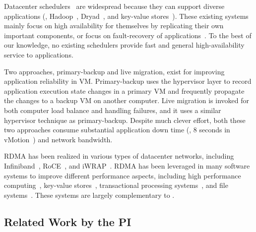  Datacenter
schedulers~\cite{borg:eurosys15,mesos:nsdi11,tupperware,yarn:socc13,
autopilot:sosp07,quincy:sosp09,apollo:osdi14,fuxi:vldb14} are widespread 
because they can support diverse applications (\eg, 
Hadoop~\cite{hadoop}, Dryad~\cite{dryad}, and key-value stores~\cite{redis}). 
These existing systems mainly focus on high availability for themselves by 
replicating their own important components, or focus on fault-recovery of 
applications~\cite{fuxi:vldb14}. To the best of our knowledge, no existing 
schedulers provide fast and general high-availability service to 
applications.

 Two approaches, primary-backup and live 
migration, exist for improving application reliability in VM. Primary-backup 
uses the hypervisor layer to record application execution state changes in a 
primary VM and frequently propagate the changes to a backup VM on another 
computer. Live migration is invoked for both computer load balance and handling 
failures, and it uses a similar hypervisor technique as primary-backup. Despite 
much clever effort, both these two approaches consume substantial application 
down time (\eg, 8 seconds in vMotion~\cite{vmotion}) and network bandwidth.


 RDMA has been realized in various types of datacenter 
networks, including Infiniband~\cite{infiniband}, RoCE~\cite{roce}, and 
iWRAP~\cite{iwrap}. RDMA has been leveraged in many software systems to improve 
different performance aspects, including high performance 
computing~\cite{openmpi}, key-value 
stores~\cite{pilaf:usenix14,herd:sigcomm14,farm:nsdi14,memcached:rdma}, 
transactional processing systems~\cite{drtm:sosp15,farm:sosp15}, and file 
systems~\cite{gibson:nfs}. These systems are largely complementary to \xxx.

\vspace{-.15in}\subsection{Related Work by the PI} 
\label{sec:my-work}\vspace{-.075in}
% 

